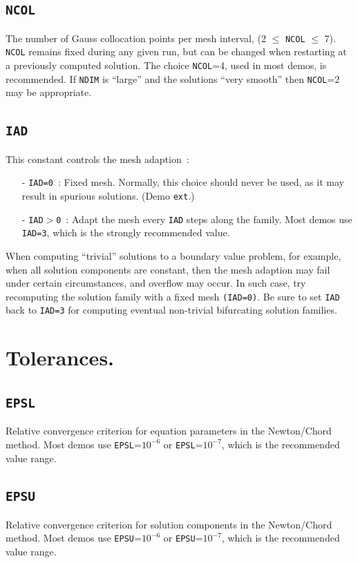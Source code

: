 \documentclass[12pt]{report}
\begin{document}
\subsection{\tt NCOL}  \label{sec:NCOL}
 The number of Gauss collocation points per mesh interval,
 (2 $\le$ {\tt NCOL} $\le$ 7).
 {\tt NCOL} remains fixed during any given run, but can be changed
 when restarting at a previously computed solution.
 The choice {\tt NCOL}=4, used in most demos, is recommended.
 If {\tt NDIM} is ``large'' and the solutions ``very smooth'' then
 {\tt NCOL}=2 may be appropriate.

\subsection{\tt IAD} \label{sec:IAD}
This constant controls the mesh adaption~: 
\begin{itemize}
\item[-] {\tt IAD=0}~:
  Fixed mesh. Normally, this choice should never be used, as it may result
  in spurious solutions. (Demo {\tt ext}.)
\item[-] {\tt IAD$>$0}~:  
  Adapt the mesh every {\tt IAD} steps along the family.
  Most demos use {\tt IAD=3}, which is the strongly recommended value.
\end{itemize}

When computing  ``trivial'' solutions to a boundary value problem,
for example, when all solution components are constant, then the
mesh adaption may fail under certain circumstances, and overflow may
occur. In such case, try recomputing the solution family with a fixed
mesh {\tt (IAD=0)}. Be sure to set  {\tt IAD} back to {\tt IAD=3} 
for computing eventual non-trivial bifurcating solution families.
\section{ Tolerances.} \label{sec:Tolerances}
\subsection{\tt EPSL}  \label{sec:EPSL}
 Relative convergence criterion for equation parameters in the Newton/Chord 
 method. Most demos use {\tt EPSL}=$10^{-6}$ or {\tt EPSL}=$10^{-7}$,
 which is the recommended value range.

\subsection{\tt EPSU}  \label{sec:EPSU}
 Relative convergence criterion for solution components in the Newton/Chord 
 method. Most demos use {\tt EPSU}=$10^{-6}$ or {\tt EPSU}=$10^{-7}$,
 which is the recommended value range.
\end{document}
